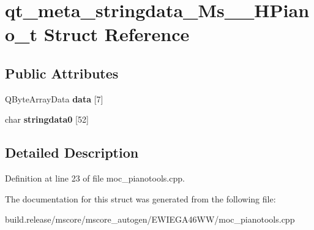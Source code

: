 \hypertarget{structqt__meta__stringdata___ms_____h_piano__t}{}\section{qt\+\_\+meta\+\_\+stringdata\+\_\+\+Ms\+\_\+\+\_\+\+H\+Piano\+\_\+t Struct Reference}
\label{structqt__meta__stringdata___ms_____h_piano__t}
\subsection*{Public Attributes}
\begin{DoxyCompactItemize}
\item 
\mbox{\label{structqt__meta__stringdata___ms_____h_piano__t_ae0e240113c33428ea51decc27b18c71e}} 
Q\+Byte\+Array\+Data {\bfseries data} \mbox{[}7\mbox{]}
\item 
\mbox{\label{structqt__meta__stringdata___ms_____h_piano__t_a141a4ef1efa5ef9d1af3a54b8b54f692}} 
char {\bfseries stringdata0} \mbox{[}52\mbox{]}
\end{DoxyCompactItemize}


\subsection{Detailed Description}


Definition at line 23 of file moc\+\_\+pianotools.\+cpp.



The documentation for this struct was generated from the following file\+:\begin{DoxyCompactItemize}
\item 
build.\+release/mscore/mscore\+\_\+autogen/\+E\+W\+I\+E\+G\+A46\+W\+W/moc\+\_\+pianotools.\+cpp\end{DoxyCompactItemize}

